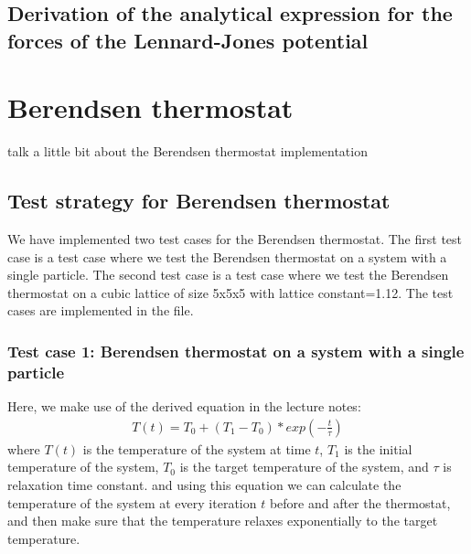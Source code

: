 \subsection{Derivation of the analytical expression for the forces of the Lennard-Jones potential}

\section{Berendsen thermostat}
talk a little bit about the Berendsen thermostat implementation
\subsection{Test strategy for Berendsen thermostat}
We have implemented two test cases for the Berendsen thermostat. The first test case is a test case where we test the Berendsen thermostat on a system with a single particle. The second test case is a test case where we test the Berendsen thermostat on a cubic lattice of size 5x5x5 with lattice constant=1.12. The test cases are implemented in the file.

\subsubsection{Test case 1: Berendsen thermostat on a system with a single particle}
Here, we make use of the derived equation in the lecture notes:
\begin{equation}
\label{eq:berendsen}
    \begin{aligned}
        T(t) = T_0 + (T_1-T_0)*{exp(-\frac{t}{\tau})}
    \end{aligned}
\end{equation}
where $T(t)$ is the temperature of the system at time $t$, $T_1$ is the initial temperature of the system, $T_0$ is the target temperature of the system, and $\tau$ is relaxation time constant. and using this equation we can calculate the temperature of the system at every iteration $t$ before and after the thermostat, and then make sure that the temperature relaxes exponentially to the target temperature.

